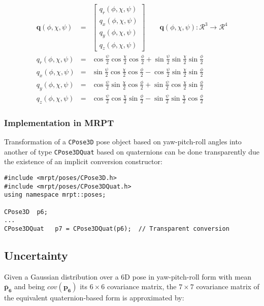 \documentclass[a4paper,11pt]{report}
\begin{document}
\begin{eqnarray}
 \mathbf{q}(\phi,\chi,\psi) &=& 
 \begin{bmatrix} 
	 q_r(\phi,\chi,\psi) \\
	 q_x(\phi,\chi,\psi) \\
	 q_y(\phi,\chi,\psi) \\
	 q_z(\phi,\chi,\psi)
 \end{bmatrix}
 \quad \quad 
 \mathbf{q}(\phi,\chi,\psi) : \mathcal{R}^3 \rightarrow \mathcal{R}^4
\\
  q_r(\phi,\chi,\psi) &=& \cos\frac{\psi}{2} \cos\frac{\chi}{2}  \cos\frac{\phi}{2}  +
  \sin\frac{\psi}{2} \sin\frac{\chi}{2} \sin\frac{\phi}{2}    \\
  q_x(\phi,\chi,\psi) &=& \sin\frac{\psi}{2} \cos\frac{\chi}{2}  \cos\frac{\phi}{2}  -
  \cos\frac{\psi}{2} \sin\frac{\chi}{2} \sin\frac{\phi}{2}    \\
  q_y(\phi,\chi,\psi) &=& \cos\frac{\psi}{2} \sin\frac{\chi}{2}  \cos\frac{\phi}{2}  +
  \sin\frac{\psi}{2} \cos\frac{\chi}{2} \sin\frac{\phi}{2}    \\
  q_z(\phi,\chi,\psi) &=& \cos\frac{\psi}{2} \cos\frac{\chi}{2}  \sin\frac{\phi}{2}  -
  \sin\frac{\psi}{2} \sin\frac{\chi}{2} \cos\frac{\phi}{2}
\end{eqnarray}


\subsubsection{Implementation in MRPT}

Transformation of a \texttt{CPose3D} pose object based on yaw-pitch-roll angles
into another of type \texttt{CPose3DQuat} based on quaternions can be done transparently
due the existence of an implicit conversion constructor:

\begin{lstlisting}
#include <mrpt/poses/CPose3D.h>
#include <mrpt/poses/CPose3DQuat.h>
using namespace mrpt::poses;

CPose3D  p6;
...
CPose3DQuat   p7 = CPose3DQuat(p6);  // Transparent conversion
\end{lstlisting}


\subsection{Uncertainty}

Given a Gaussian distribution over a 6D pose in yaw-pitch-roll form with
mean ${\mathbf{\bar{p}_6}}$ and being  $cov(\mathbf{p_6})$ its $6 \times 6$ covariance matrix,
the $7 \times 7$ covariance matrix of the equivalent quaternion-based form
is approximated by:
\end{document}
